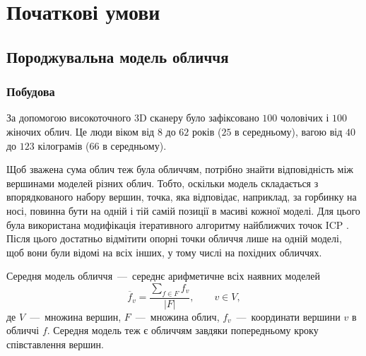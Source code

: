 \section{Початкові умови}

\vspace{-\baselineskip}

\subsection{Породжувальна модель обличчя}

\vspace{-\baselineskip}

\subsubsection{Побудова}

За допомогою високоточного 3D сканеру
було зафіксовано $100$ чоловічих і $100$ жіночих облич.
Це люди віком від $8$ до $62$ років ($25$ в середньому),
вагою від $40$ до $123$ кілограмів ($66$ в середньому).

Щоб зважена сума облич теж була обличчям,
потрібно знайти відповідність між вершинами моделей різних облич.
Тобто, оскільки модель складається з впорядкованого набору вершин,
точка, яка відповідає, наприклад, за горбинку на носі,
повинна бути на одній і тій самій позиції в масиві кожної моделі.
Для цього була використана модифікація
ітеративного алгоритму найближчих точок ICP \cite{AmbergRV07}.
Після цього достатньо відмітити опорні точки обличчя лише на одній моделі,
щоб вони були відомі на всіх інших,
у тому числі на похідних обличчях.

Середня модель обличчя~---~середнє арифметичне всіх наявних моделей
\begin{equation*}
  \overline{f}_v
  = \frac{\sum\limits_{f \in F} f_v}{\left| F \right|},\qquad
  v \in V,
\end{equation*}
де $V$~---~множина вершин, $F$~---~множина облич,
$f_v$~---~координати вершини $v$ в обличчі $f$.
Середня модель теж є обличчям завдяки попередньому кроку співставлення вершин.


